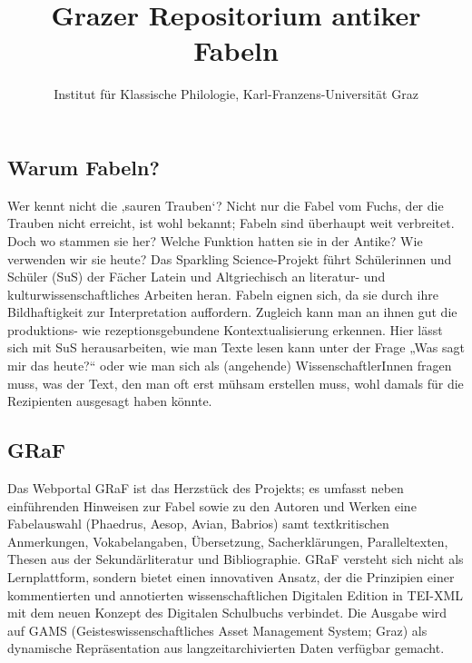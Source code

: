 \documentclass[14pt, a2paper, portrait,innermargin=5mm,
blockverticalspace=5mm, colspace=5mm, subcolspace=3mm]{tikzposter}
\title{{\rustfamily\bfseries Grazer Repositorium antiker Fabeln}}
\author{Institut für Klassische Philologie, Karl-Franzens-Universität Graz}
\begin{document}
\maketitle

{
\begin{minipage}[t]{0.45\textwidth}\vspace{0pt}

\subsection*{\Large Warum Fabeln?}
Wer kennt nicht die ‚sauren Trauben‘? Nicht nur die Fabel vom Fuchs, der die Trauben nicht erreicht, ist wohl bekannt; Fabeln sind überhaupt weit verbreitet. Doch wo stammen sie her? Welche Funktion hatten sie in der Antike? Wie verwenden wir sie heute? 
Das Sparkling Science-Projekt führt Schülerinnen und Schüler (SuS) der Fächer Latein und Altgriechisch an literatur- und kulturwissenschaftliches Arbeiten heran. Fabeln eignen sich, da sie durch ihre Bildhaftigkeit zur Interpretation auffordern. Zugleich kann man an ihnen gut die produktions- wie rezeptionsgebundene Kontextualisierung erkennen. Hier lässt sich mit SuS herausarbeiten, wie man Texte lesen kann unter der Frage „Was sagt mir das heute?“ oder wie man sich als (angehende) WissenschaftlerInnen fragen muss, was der Text, den man oft erst mühsam erstellen muss, wohl damals für die Rezipienten ausgesagt haben könnte. 


\end{minipage}\hfill\hspace{1em}
\begin{minipage}[t]{0.41\textwidth}\vspace{0pt}


\subsection*{\Large GRaF}
Das Webportal GRaF ist das Herzstück des Projekts; es umfasst neben einführenden Hinweisen zur Fabel sowie zu den Autoren und Werken eine Fabelauswahl (Phaedrus, Aesop, Avian, Babrios) samt textkritischen Anmerkungen, Vokabelangaben, Übersetzung, Sacherklärungen, Paralleltexten, Thesen aus der Sekundärliteratur und Bibliographie. GRaF versteht sich nicht als Lernplattform, sondern bietet einen innovativen Ansatz, der die Prinzipien einer kommentierten und annotierten wissenschaftlichen Digitalen Edition in TEI-XML mit dem neuen Konzept des Digitalen Schulbuchs verbindet. Die Ausgabe wird auf GAMS (Geisteswissenschaftliches Asset Management System; Graz) als dynamische Repräsentation aus langzeitarchivierten Daten verfügbar gemacht. 



\end{minipage}}
\end{document}
